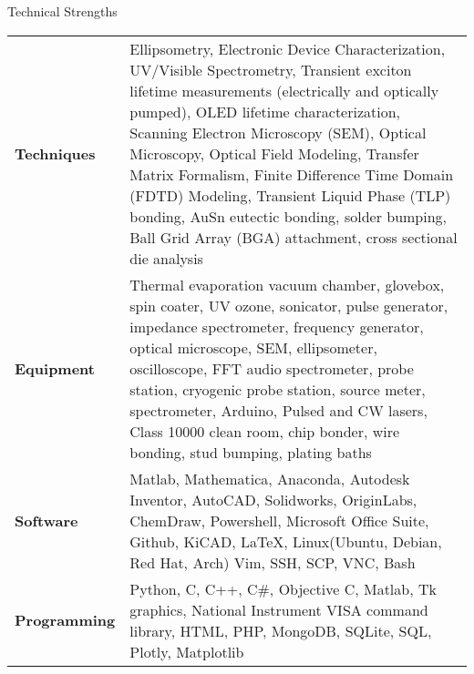 \documentclass{resume} %
\begin{document}
\begin{rSection}{Technical Strengths}

\begin{tabular}{ @{} >{\hspace{-0.5em}\bfseries}l @{\hspace{3ex}} p{14.25cm} }
Techniques & Ellipsometry, Electronic Device Characterization, UV/Visible Spectrometry, Transient exciton lifetime measurements (electrically and optically pumped), OLED lifetime characterization, Scanning Electron Microscopy (SEM), Optical Microscopy, Optical Field Modeling, Transfer Matrix Formalism, Finite Difference Time Domain (FDTD) Modeling, Transient Liquid Phase (TLP) bonding, AuSn eutectic bonding, solder bumping, Ball Grid Array (BGA) attachment, cross sectional die analysis \\
Equipment & Thermal evaporation vacuum chamber, glovebox, spin coater, UV ozone, sonicator, pulse generator, impedance spectrometer, frequency generator, optical microscope, SEM, ellipsometer, oscilloscope, FFT audio spectrometer, probe station, cryogenic probe station, source meter, spectrometer, Arduino, Pulsed and CW lasers, Class 10000 clean room, chip bonder, wire bonding, stud bumping, plating baths \\
Software & Matlab, Mathematica, Anaconda, Autodesk Inventor, AutoCAD, Solidworks, OriginLabs, ChemDraw, Powershell, Microsoft Office Suite, Github, KiCAD, \LaTeX , Linux(Ubuntu, Debian, Red Hat, Arch) Vim, SSH, SCP, VNC, Bash \\
Programming & Python, C, C++, C\#, Objective C, Matlab, Tk graphics, National Instrument VISA command library, HTML, PHP, MongoDB, SQLite, SQL, Plotly, Matplotlib \\
\end{tabular}

\end{rSection}

\end{document}
